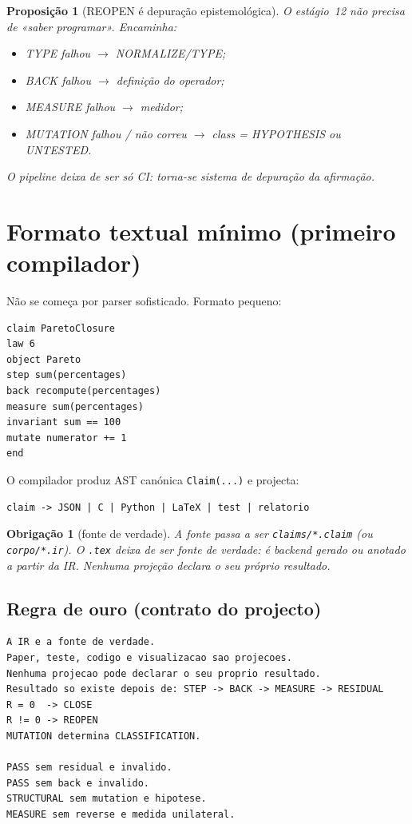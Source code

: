 \documentclass[11pt,a4paper]{article}
\newcommand{\code}[1]{\texttt{\small #1}}
\newtheorem{proposicao}[teorema]{Proposição}
\newtheorem{obrigacao}[teorema]{Obrigação}
\begin{document}
\begin{proposicao}[REOPEN é depuração epistemológica]\label{prop:reopen}
O estágio~12 não precisa de «saber programar». Encaminha:
\begin{itemize}\itemsep2pt
\item TYPE falhou $\to$ NORMALIZE/TYPE;
\item BACK falhou $\to$ definição do operador;
\item MEASURE falhou $\to$ medidor;
\item MUTATION falhou / não correu $\to$ class = HYPOTHESIS ou UNTESTED.
\end{itemize}
O pipeline deixa de ser só CI: torna-se sistema de depuração da afirmação.
\end{proposicao}

\section{Formato textual mínimo (primeiro compilador)}\label{sec:formato}

Não se começa por parser sofisticado. Formato pequeno:

\begin{verbatim}
claim ParetoClosure
law 6
object Pareto
step sum(percentages)
back recompute(percentages)
measure sum(percentages)
invariant sum == 100
mutate numerator += 1
end
\end{verbatim}

\noindent O compilador produz AST canónica \code{Claim(...)} e projecta:
\begin{verbatim}
claim -> JSON | C | Python | LaTeX | test | relatorio
\end{verbatim}

\begin{obrigacao}[fonte de verdade]\label{ob:fonte}
A fonte passa a ser \code{claims/*.claim} (ou \code{corpo/*.ir}). O
\code{.tex} deixa de ser fonte de verdade: é backend gerado ou anotado a
partir da IR. Nenhuma projeção declara o seu próprio resultado.
\end{obrigacao}

\subsection*{Regra de ouro (contrato do projecto)}
\begin{verbatim}
A IR e a fonte de verdade.
Paper, teste, codigo e visualizacao sao projecoes.
Nenhuma projecao pode declarar o seu proprio resultado.
Resultado so existe depois de: STEP -> BACK -> MEASURE -> RESIDUAL
R = 0  -> CLOSE
R != 0 -> REOPEN
MUTATION determina CLASSIFICATION.

PASS sem residual e invalido.
PASS sem back e invalido.
STRUCTURAL sem mutation e hipotese.
MEASURE sem reverse e medida unilateral.
\end{verbatim}
\end{document}

